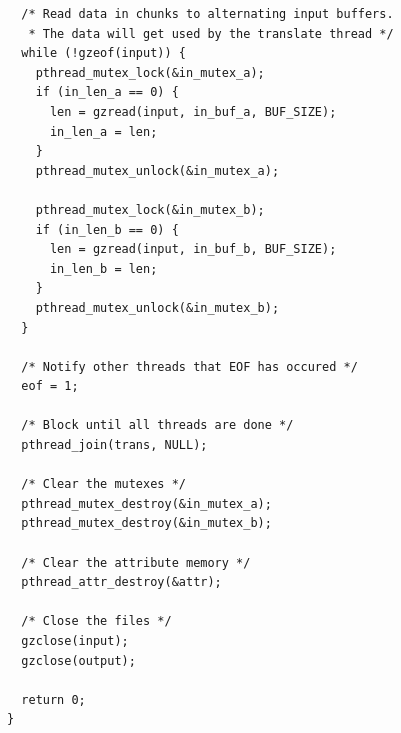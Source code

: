 \documentclass[a4paper,12pt]{article}
\begin{document}
\begin{verbatim}
  /* Read data in chunks to alternating input buffers.
   * The data will get used by the translate thread */
  while (!gzeof(input)) {
    pthread_mutex_lock(&in_mutex_a);
    if (in_len_a == 0) {
      len = gzread(input, in_buf_a, BUF_SIZE);
      in_len_a = len;
    }
    pthread_mutex_unlock(&in_mutex_a);
    
    pthread_mutex_lock(&in_mutex_b);
    if (in_len_b == 0) {
      len = gzread(input, in_buf_b, BUF_SIZE);
      in_len_b = len;
    }
    pthread_mutex_unlock(&in_mutex_b);
  }

  /* Notify other threads that EOF has occured */
  eof = 1;

  /* Block until all threads are done */
  pthread_join(trans, NULL);

  /* Clear the mutexes */
  pthread_mutex_destroy(&in_mutex_a);
  pthread_mutex_destroy(&in_mutex_b);

  /* Clear the attribute memory */
  pthread_attr_destroy(&attr);

  /* Close the files */
  gzclose(input);
  gzclose(output);

  return 0;
}
\end{verbatim}
\end{document}
